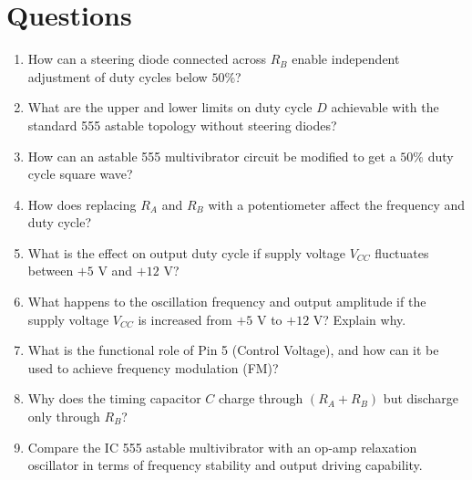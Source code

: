 \section{Questions}
\begin{enumerate}
	\item How can a steering diode connected across $R_B$ enable independent adjustment of duty cycles below $50\%$?
	\item What are the upper and lower limits on duty cycle $D$ achievable with the standard 555 astable topology without steering diodes?
	\item How can an astable 555 multivibrator circuit be modified to get a $50\%$ duty cycle square wave?
	\item How does replacing $R_A$ and $R_B$ with a potentiometer affect the frequency and duty cycle?
	\item What is the effect on output duty cycle if supply voltage $V_{CC}$ fluctuates between $+5\text{ V}$ and $+12\text{ V}$?

	\item What happens to the oscillation frequency and output amplitude if the supply voltage $V_{CC}$ is increased from $+5\text{ V}$ to $+12\text{ V}$? Explain why.
	\item What is the functional role of Pin 5 (Control Voltage), and how can it be used to achieve frequency modulation (FM)?
\item Why does the timing capacitor $C$ charge through $(R_A + R_B)$ but discharge only through $R_B$?
\item Compare the IC 555 astable multivibrator with an op-amp relaxation oscillator in terms of frequency stability and output driving capability.
\end{enumerate}